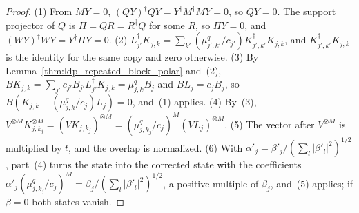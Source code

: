 \begin{proof}
    \leanok
    (1) From $MY=0$, $(QY)^\dagger QY=Y^\dagger M^\dagger MY=0$, so $QY=0$. The support
    projector of $Q$ is $\Pi=QR=R^\dagger Q$ for some $R$, so $\Pi Y=0$, and
    $(WY)^\dagger WY=Y^\dagger\Pi Y=0$.
    (2) $L_{j'}^\dagger K_{j,k}=\sum_{k'}(\mu_{j',k'}^q/c_{j'})K_{j',k'}^\dagger K_{j,k}$,
    and $K_{j',k'}^\dagger K_{j,k}$ is the identity for the same copy and zero otherwise.
    (3) By Lemma~\ref{thm:ldp_repeated_block_polar} and~(2),
    $BK_{j,k}=\sum_{j'}c_{j'}B_{j'}L_{j'}^\dagger K_{j,k}=\mu_{j,k}^qB_j$ and
    $BL_j=c_jB_j$, so $B(K_{j,k}-(\mu_{j,k}^q/c_j)L_j)=0$, and~(1) applies.
    (4) By~(3),
    $V^{\otimes M}K_{j,k_j}^{\otimes M}=(VK_{j,k_j})^{\otimes M}
        =(\mu_{j,k_j}^q/c_j)^M(VL_j)^{\otimes M}$.
    (5) The vector after $V^{\otimes M}$ is multiplied by $t$, and the overlap is
    normalized.
    (6) With $\alpha'_j=\beta'_j/(\sum_l\lvert\beta'_l\rvert^2)^{1/2}$, part~(4) turns the
    state into the corrected state with the coefficients
    $\alpha'_j(\mu_{j,k_j}^q/c_j)^M=\beta_j/(\sum_l\lvert\beta'_l\rvert^2)^{1/2}$, a positive
    multiple of $\beta_j$, and~(5) applies; if $\beta=0$ both states vanish.
\end{proof}

